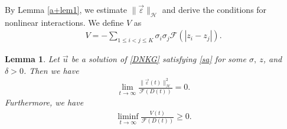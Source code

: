 \documentclass[reqno]{amsart}
\theoremstyle{plain}
\newtheorem{lemma}[theorem]{Lemma}
\theoremstyle{definition}
\numberwithin{equation}{section}
\newcommand{\1}{\mathbbm{1}}
\begin{document}
By Lemma \ref{a+lem1}, we estimate $\|\vec{\varepsilon}\|_{\mathcal{H}}$ and derive the conditions for nonlinear interactions. We define $V$ as 
\begin{align}\label{Vdef}
V=-\sum_{1\leq i<j\leq K}\sigma_i\sigma_j\mathcal{F}(|z_i-z_j|).
\end{align}
\begin{lemma}\label{limeplem}
Let $\vec{u}$ be a solution of \eqref{DNKG} satisfying \eqref{sa} for some $\sigma,\ z$, and $\delta>0$. Then we have
\begin{align}\label{limep}
\lim_{t\to\infty} \frac{\|\vec{\varepsilon}(t)\|_{\mathcal{H}}^2}{\mathcal{F}(D(t))}=0.
\end{align}
Furthermore, we have
\begin{align}\label{Ves1}
\liminf_{t\to\infty} \frac{V(t)}{\mathcal{F}(D(t))}\geq 0.
\end{align}
\end{lemma}
\end{document}

